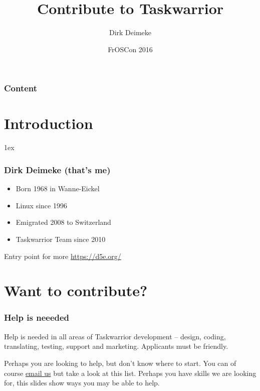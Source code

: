\documentclass[t,handout]{beamer}
\title{Contribute to Taskwarrior}
\author[Deimeke, Dirk]{Dirk Deimeke}
\institute[Taskwarrior academy]{Taskwarrior academy}
\date{FrOSCon 2016}
\begin{document}
\begin{frame} %
	\titlepage
\end{frame}


\begin{frame}\frametitle{Content}
	\tableofcontents
\end{frame}

\section{Introduction}

\parskip1ex

\begin{frame}[fragile]\frametitle{Dirk Deimeke (that's me)}
    \vfill
    \begin{itemize}
        \item Born 1968 in Wanne-Eickel
        \item Linux since 1996
        \item Emigrated 2008 to Switzerland
        \item Taskwarrior Team since 2010
    \end{itemize}

    Entry point for more \url{https://d5e.org/}
\end{frame}

\section{Want to contribute?}

\begin{frame}[fragile]\frametitle{Help is neeeded}
    \vfill
    Help is needed in all areas of Taskwarrior development -- design, coding, translating, testing, support and marketing. Applicants must be friendly.

    Perhaps you are looking to help, but don't know where to start. You can of course \href{mailto:taskwarrior-dev@googlegroups.com}{email us} but take a look at this list. Perhaps you have skills we are looking for, this slides show ways you may be able to help.
    \vfill
\end{frame}
\end{document}

